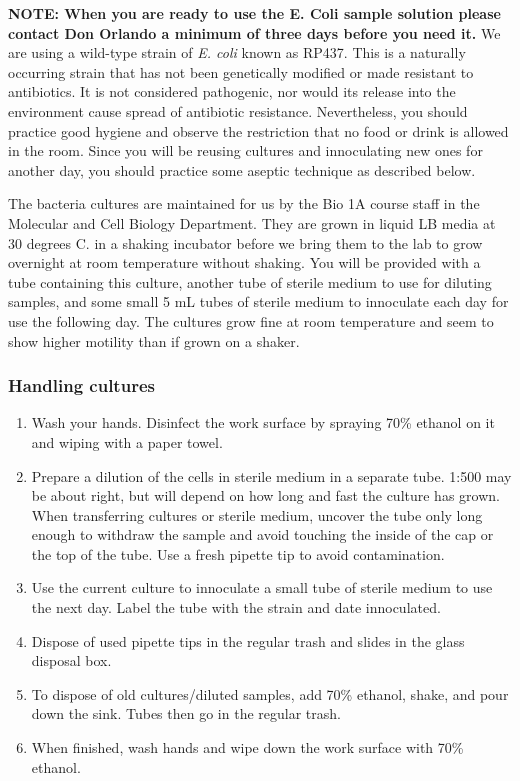 \documentclass{../lab}
\begin{document}
\textbf{NOTE: When you are ready to use the E. Coli sample solution please contact Don Orlando a minimum of three days before you need it.} We are using a wild-type strain of \emph{E. coli} known as RP437. This is a naturally occurring strain that has not been genetically modified or made resistant to antibiotics. It is not considered pathogenic, nor would its release into the environment cause spread of antibiotic resistance. Nevertheless, you should practice good hygiene and observe the restriction that no food or drink is allowed in the room. Since you will be reusing cultures and innoculating new ones for another day, you should practice some aseptic technique as described below.

The bacteria cultures are maintained for us by the Bio 1A course staff in the Molecular and Cell Biology Department. They are grown in liquid LB media at 30 degrees C. in a shaking incubator before we bring them to the lab to grow overnight at room temperature without shaking. You will be provided with a tube containing this culture, another tube of sterile medium to use for diluting samples, and some small 5 mL tubes of sterile medium to innoculate each day for use the following day. The cultures grow fine at room temperature and seem to show higher motility than if grown on a shaker.

\subsubsection{Handling cultures}

\begin{enumerate}
    \item Wash your hands. Disinfect the work surface by spraying 70\% ethanol on it and wiping with a paper towel.

    \item Prepare a dilution of the cells in sterile medium in a separate tube. 1:500 may be about right, but will depend on how long and fast the culture has grown. When transferring cultures or sterile medium, uncover the tube only long enough to withdraw the sample and avoid touching the inside of the cap or the top of the tube. Use a fresh pipette tip to avoid contamination.

    \item Use the current culture to innoculate a small tube of sterile medium to use the next day. Label the tube with the strain and date innoculated.

    \item Dispose of used pipette tips in the regular trash and slides in the glass disposal box.

    \item To dispose of old cultures/diluted samples, add 70\% ethanol, shake, and pour down the sink. Tubes then go in the regular trash.

    \item When finished, wash hands and wipe down the work surface with 70\% ethanol.

\end{enumerate}
\end{document}
